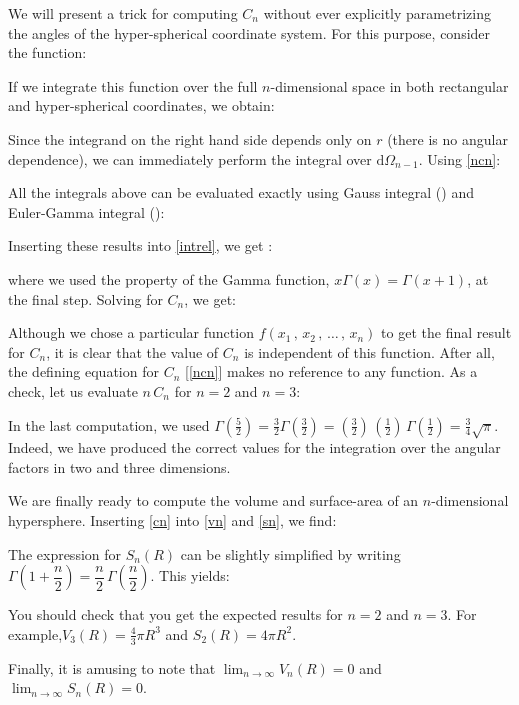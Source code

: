 {	
	We will present a trick for computing $C_n$ without ever explicitly parametrizing the angles of the hyper-spherical coordinate system.  For this purpose, consider the function:
	
	If we integrate this function over the full $n$-dimensional space in both rectangular and hyper-spherical coordinates, we obtain:
	
	Since the integrand on the right hand side depends only on $r$ (there is no angular dependence), we can immediately perform the integral over $\mathrm{d}\Omega_{n-1}$.   Using \ref{ncn}:
	
	All the integrals above can be evaluated exactly using Gauss integral () and Euler-Gamma integral ():
	
	Inserting these results into \ref{intrel}, we get :
	
	where we used the property of the Gamma function, $x\Gamma(x)=\Gamma(x+1)$, at the final
	step.  Solving for $C_n$, we get:
	
	
	Although we chose a particular function $f(x_1\,,\,x_2\,,\,\ldots\,,\,x_n)$ to get the final result for $C_n$, it is clear that the value of $C_n$ is independent of this function.  After all, the defining equation for $C_n$ [\ref{ncn}] makes no reference to any function.  As a check, let us evaluate $n\,C_n$ for $n=2$ and $n=3$:
	
	In the last computation, we used $\Gamma\left(\frac{5}{2}\right)=\frac{3}{2}
	\Gamma\left(\frac{3}{2}\right)=(\frac{3}{2})\,(\frac{1}{2})\,\Gamma\left(\frac{1}{2}\right)=
	\frac{3}{4}\sqrt{\pi}$.  Indeed, we have produced the correct values for the
	integration over the angular factors in two and three dimensions.
	
	We are finally ready to compute the volume and surface-area of an $n$-dimensional hypersphere.  Inserting \ref{cn} into \ref{vn} and \ref{sn}, we find:
	
	The expression for $S_n(R)$ can be slightly simplified by writing $\Gamma\left(1+\dfrac{n}{2}\right)=\dfrac{n}{2}\,\Gamma\left(\dfrac{n}{2}\right)$. This	yields:
	
	You should check that you get the expected results for $n=2$ and $n=3$.  For example,$V_3(R)=\frac{4}{3}\pi R^3$ and $S_2(R)=4\pi R^2$.
	
	Finally, it is amusing to note that $\lim_{n\to\infty} V_n(R)=0$ and $\lim_{n\to\infty} S_n(R)=0$.  
	
}
